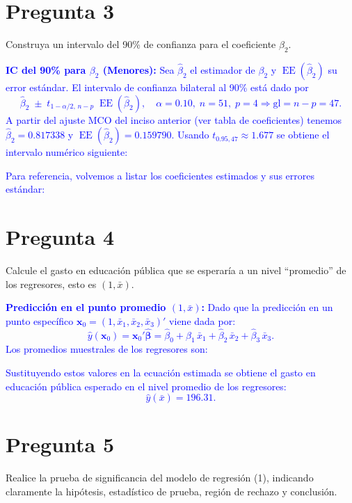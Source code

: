 \documentclass[10pt]{article}
\begin{document}
\section{Pregunta 3}
Construya un intervalo del 90\% de confianza para el coeficiente $\beta_2$. \\

\textcolor{blue}{
    \textbf{IC del 90\% para $\beta_2$ (Menores):}
    Sea $\hat\beta_2$ el estimador de $\beta_2$ y $\operatorname{EE}(\hat\beta_2)$ su error estándar. El intervalo de confianza bilateral al 90\% está dado por
    \[
        \hat\beta_2 \;\pm\; t_{1-\alpha/2,\,n-p}\; \operatorname{EE}(\hat\beta_2),\quad \alpha=0.10,\; n=51,\; p=4 \Rightarrow \text{gl}=n-p=47.
    \]
    A partir del ajuste MCO del inciso anterior (ver tabla de coeficientes) tenemos $\hat\beta_2=0.817338$ y $\operatorname{EE}(\hat\beta_2)=0.159790$. Usando $t_{0.95,47}\approx 1.677$ se obtiene el intervalo numérico siguiente:
    
    Para referencia, volvemos a listar los coeficientes estimados y sus errores estándar:
    
}
\section{Pregunta 4}
Calcule el gasto en educación pública que se esperaría a un nivel “promedio” de los regresores, esto es $(1,\bar{x})$. \\

\textcolor{blue}{
    \textbf{Predicción en el punto promedio $(1,\bar x)$:}
    Dado que la predicción en un punto específico $\mathbf{x}_0 = (1,\bar x_1, \bar x_2, \bar x_3)'$ viene dada por:
    \[
        \hat y(\mathbf{x}_0) = \mathbf{x}_0' \hat{\boldsymbol\beta} 
        = \hat\beta_0 + \hat\beta_1\,\bar x_1 + \hat\beta_2\,\bar x_2 + \hat\beta_3\,\bar x_3.
    \]
    Los promedios muestrales de los regresores son:
    
    Sustituyendo estos valores en la ecuación estimada se obtiene el gasto en educación pública esperado en el nivel promedio de los regresores:
    \[
        \hat y(\bar x) = 196.31.
    \]
}

\section{Pregunta 5}
Realice la prueba de significancia del modelo de regresión (1), indicando claramente la hipótesis, estadístico de prueba, región de rechazo y conclusión. \\
\end{document}
